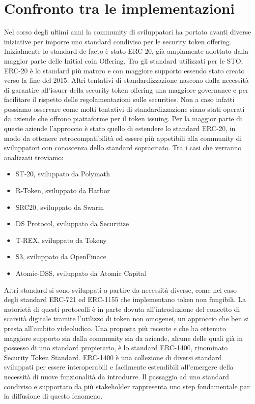 \chapter{Confronto tra le implementazioni}
Nel corso degli ultimi anni la community di sviluppatori ha portato avanti diverse iniziative per imporre uno standard condiviso per le security token offering. Inizialmente lo standard de facto è stato ERC-20\cite{K37}, già ampiamente adottato dalla maggior parte delle Initial coin Offering. Tra gli standard utilizzati per le STO, ERC-20 è lo standard più maturo e con maggiore supporto essendo stato creato verso la fine del 2015. Altri tentativi di standardizzazione nascono dalla necessità di garantire all'issuer della security token offering una maggiore governance e per facilitare il rispetto delle regolamentazioni sulle securities. Non a caso infatti possiamo osservare come molti tentativi di standardizzazione siano stati operati da aziende che offrono piattaforme per il token issuing. Per la maggior parte di queste aziende l'approccio è stato quello di estendere lo standard ERC-20, in modo da ottenere retrocompatibilità ed essere più appetibili alla community di sviluppatori con conoscenza dello standard sopracitato. Tra i casi che verranno analizzati troviamo: 
\begin{itemize}
    \item ST-20\cite{K38}, sviluppato da Polymath
    \item R-Token\cite{K39}, sviluppato da Harbor
    \item SRC20\cite{K40}, sviluppato da Swarm
    \item DS Protocol\cite{K41}, sviluppato da Securitize
    \item T-REX\cite{K42}, sviluppato da Tokeny
    \item S3\cite{K43}, sviluppato da OpenFinace
    \item Atomic-DSS\cite{K44}, sviluppato da Atomic Capital
\end{itemize}

Altri standard si sono sviluppati a partire da necessità diverse, come nel caso degli standard ERC-721 ed ERC-1155 che implementano token non fungibili. La notorietà di questi protocolli è in parte dovuta all'introduzione del concetto di scarsità digitale tramite l'utilizzo di token non omogenei, un approccio che ben si presta all'ambito videoludico. 
Una proposta più recente e che ha ottenuto maggiore supporto sia dalla community sia da aziende, alcune delle quali già in possesso di uno standard propietario, è lo standard ERC-1400, rinominato Security Token Standard\cite{K45}. ERC-1400 è una collezione di diversi standard sviluppati per essere interoperabili e facilmente estendibili all'emergere della necessità di nuove funzionalità da introdurre. Il passaggio ad uno standard condiviso e supportato da più stakeholder rappresenta uno step fondamentale par la diffusione di questo fenomeno.

